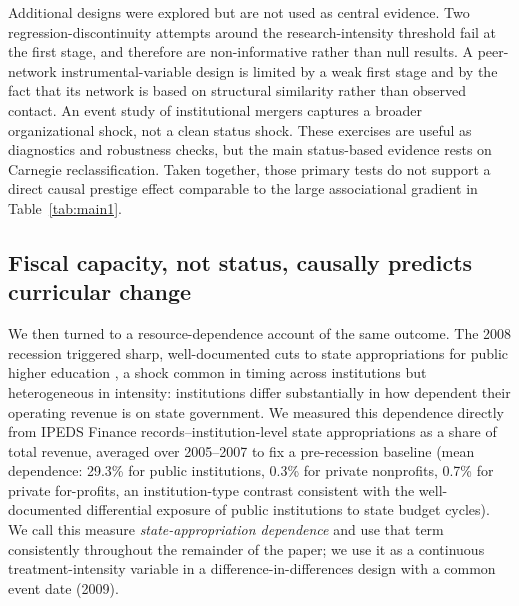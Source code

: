 \documentclass[11pt, letterpaper]{article}
\newcommand{\parencite}[1]{\cite{#1}}
\begin{document}
Additional designs were explored but are not used as central evidence. Two regression-discontinuity attempts around the research-intensity threshold fail at the first stage, and therefore are non-informative rather than null results. A peer-network instrumental-variable design is limited by a weak first stage and by the fact that its network is based on structural similarity rather than observed contact. An event study of institutional mergers captures a broader organizational shock, not a clean status shock. These exercises are useful as diagnostics and robustness checks, but the main status-based evidence rests on Carnegie reclassification. Taken together, those primary tests do not support a direct causal prestige effect comparable to the large associational gradient in Table~\ref{tab:main1}.

\subsection*{Fiscal capacity, not status, causally predicts curricular change}

We then turned to a resource-dependence account of the same outcome. The 2008 recession triggered sharp, well-documented cuts to state appropriations for public higher education \parencite{demingwalters2017}, a shock common in timing across institutions but heterogeneous in intensity: institutions differ substantially in how dependent their operating revenue is on state government. We measured this dependence directly from IPEDS Finance records--institution-level state appropriations as a share of total revenue, averaged over 2005--2007 to fix a pre-recession baseline (mean dependence: 29.3\% for public institutions, 0.3\% for private nonprofits, 0.7\% for private for-profits, an institution-type contrast consistent with the well-documented differential exposure of public institutions to state budget cycles). We call this measure \emph{state-appropriation dependence} and use that term consistently throughout the remainder of the paper; we use it as a continuous treatment-intensity variable in a difference-in-differences design with a common event date (2009).
\end{document}
